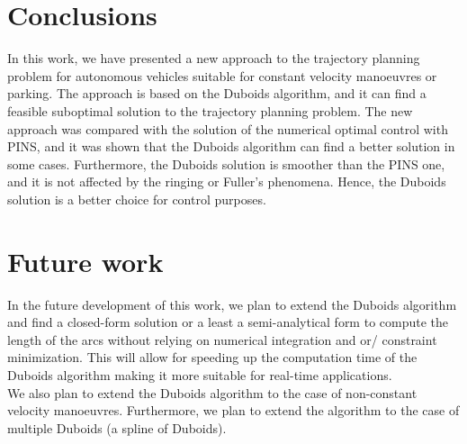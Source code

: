 \documentclass[11pt,twocolumn]{scrartcl}
\begin{document}
\section*{Conclusions}
%
In this work, we have presented a new approach to the trajectory planning problem for autonomous vehicles suitable for constant velocity manoeuvres or parking. The approach is based on the Duboids algorithm, and it can find a feasible suboptimal solution to the trajectory planning problem. 
%
The new approach was compared with the solution of the numerical optimal control with PINS, and it was shown that the Duboids algorithm can find a better solution in some cases. Furthermore, the Duboids solution is smoother than the PINS one, and it is not affected by the ringing or Fuller's phenomena. Hence, the Duboids solution is a better choice for control purposes.
%
\section*{Future work}
%
In the future development of this work, we plan to extend the Duboids algorithm and find a closed-form solution or a least a semi-analytical form to compute the length of the arcs without relying on numerical integration and or/ constraint minimization. This will allow for speeding up the computation time of the Duboids algorithm making it more suitable for real-time applications.\\
We also plan to extend the Duboids algorithm to the case of non-constant velocity manoeuvres. Furthermore, we plan to extend the algorithm to the case of multiple Duboids (a spline of Duboids).
%


%
\end{document}
